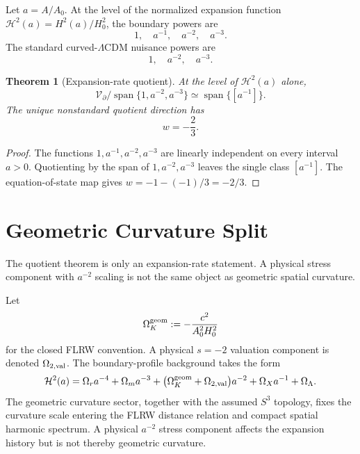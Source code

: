 \documentclass[aps,prd,preprint,onecolumn,nofootinbib,superscriptaddress,showkeys]{revtex4-2}
\numberwithin{equation}{section}
\theoremstyle{definition}
\theoremstyle{plain}
\newtheorem{theorem}{Theorem}[section]
\newcommand{\spanop}{\operatorname{span}}
\begin{document}
Let \(a=A/A_0\).  At the level of the normalized expansion function \(\mathcal H^2(a)=H^2(a)/H_0^2\), the boundary powers are
\begin{equation}
1,\quad a^{-1},\quad a^{-2},\quad a^{-3}.
\end{equation}
The standard curved-\(\Lambda\)CDM nuisance powers are
\begin{equation}
1,\quad a^{-2},\quad a^{-3}.
\end{equation}

\begin{theorem}[Expansion-rate quotient]
At the level of \(\mathcal H^2(a)\) alone,
\begin{equation}
\mathcal V_\partial/
\spanop\{1,a^{-2},a^{-3}\}
\simeq
\spanop\{[a^{-1}]\}.
\end{equation}
The unique nonstandard quotient direction has
\begin{equation}
w=-\frac23.
\end{equation}
\end{theorem}

\begin{proof}
The functions \(1,a^{-1},a^{-2},a^{-3}\) are linearly independent on every interval \(a>0\).  Quotienting by the span of \(1,a^{-2},a^{-3}\) leaves the single class \([a^{-1}]\).  The equation-of-state map gives \(w=-1-(-1)/3=-2/3\).
\end{proof}

\section{Geometric Curvature Split}

The quotient theorem is only an expansion-rate statement.  A physical stress component with \(a^{-2}\) scaling is not the same object as geometric spatial curvature.

Let
\begin{equation}
\Omega_K^{\rm geom}:=-\frac{c^2}{A_0^2H_0^2}
\end{equation}
for the closed FLRW convention.  A physical \(s=-2\) valuation component is denoted \(\Omega_{2,\rm val}\).  The boundary-profile background takes the form
\begin{equation}
\mathcal H^2(a)=
\Omega_ra^{-4}
+\Omega_ma^{-3}
+\bigl(\Omega_K^{\rm geom}+\Omega_{2,\rm val}\bigr)a^{-2}
+\Omega_Xa^{-1}
+\Omega_\Lambda.
\end{equation}
The geometric curvature sector, together with the assumed \(S^3\) topology, fixes the curvature scale entering the FLRW distance relation and compact spatial harmonic spectrum.  A physical \(a^{-2}\) stress component affects the expansion history but is not thereby geometric curvature.
\end{document}
